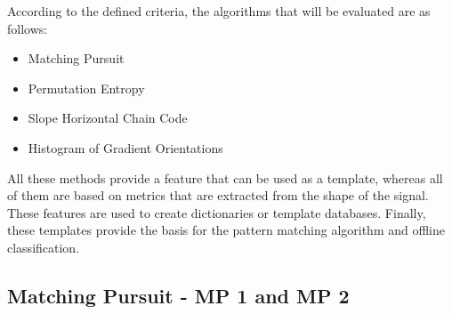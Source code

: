 \documentclass[brainsci,article,submit,moreauthors,pdftex,10pt,a4paper]{mdpi}
\begin{document}


%
%
%
%
%
%
%
%
%
%

According to the defined criteria, the algorithms that will be evaluated are as follows:

\begin{itemize}
\item Matching Pursuit
\item Permutation Entropy
\item Slope Horizontal Chain Code
\item Histogram of Gradient Orientations
\end{itemize}

All these methods provide a feature that can be used as a template, whereas all of them are based on metrics that are extracted from the shape of the signal.  These features are used to create dictionaries or template databases.  Finally, these templates provide the basis for the pattern matching algorithm and offline classification.

\subsection{Matching Pursuit - MP 1 and MP 2}
\end{document}
